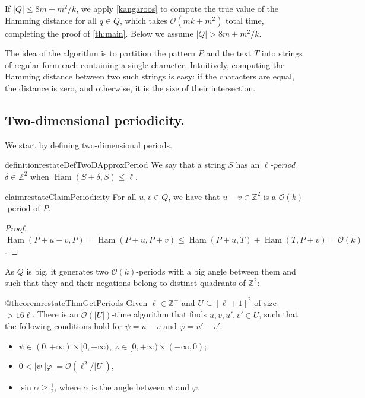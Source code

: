 \documentclass[a4paper,11pt]{article}
\newcommand{\Z}{\mathbb{Z}}
\renewcommand{\O}{\mathcal{O}}
\newcommand{\tO}{\tilde{\mathcal{O}}}
\renewcommand{\phi}{\varphi}
\DeclareMathOperator*{\Ham}{Ham}
\newcommand{\absolute}[1]{\left\lvert#1\right\rvert}
\begin{document}
If $\absolute{Q} \le 8m + m^2/k$, we apply \cref{kangaroos} to compute the true value of the Hamming distance for all $q \in Q$, which takes $\O(mk+m^2)$ total time, completing the proof of \cref{th:main}. Below we assume $\absolute{Q} > 8m + m^2/k$. 

The idea of the algorithm is to partition the pattern $P$ and the text $T$ into strings of regular form each containing a single character. Intuitively, computing the Hamming distance between two such strings is easy: if the characters are equal, the distance is zero, and otherwise, it is the size of their intersection.

\subsection{Two-dimensional periodicity.}
We start by defining two-dimensional periods.



\begin{restatable*}{definition}{restateDefTwoDApproxPeriod}
We say that a string $S$ has an \emph{$\ell$-period} $\delta \in \Z^2$ when $\Ham(S + \delta, S) \le \ell$.
\end{restatable*}

\begin{restatable*}{claim}{restateClaimPeriodicity} \label{periodicity_lemma}
For all $u, v \in Q$, we have that $u - v \in \Z^2$ is a $\O(k)$-period of $P$.
\end{restatable*}	
\begin{proof}
$\Ham(P + u - v, P) = \Ham(P + u, P + v) \le \Ham(P + u, T) + \Ham(T,P + v) = \O(k)$.
\end{proof}


As $Q$ is big, it generates two $\O(k)$-periods with a big angle between them and such that they and their negations belong to distinct quadrants of $\Z^2$: 

\begin{restatable*}{@theorem}{restateThmGetPeriods}\label{get_periods}
Given $\ell \in \Z^+$ and $U \subseteq [\ell + 1]^2$ of size $> 16\ell$. There is an $\tO(\absolute{U})$-time algorithm that finds $u, v, u', v' \in U$, such that the following conditions hold for $\psi = u - v$ and $\phi = u' - v'$:
	\begin{itemize}
		\item $\psi \in (0, +\infty) \times [0, +\infty)$, $\phi \in [0, +\infty) \times (-\infty, 0)$;
		\item $0 < \absolute{\psi}\absolute{\phi} = \O(\ell^2 / \absolute{U})$,
		\item $\sin \alpha \ge \frac{1}{2}$, where $\alpha$ is the angle between $\psi$ and $\phi$.
	\end{itemize}
\end{restatable*}
\end{document}
